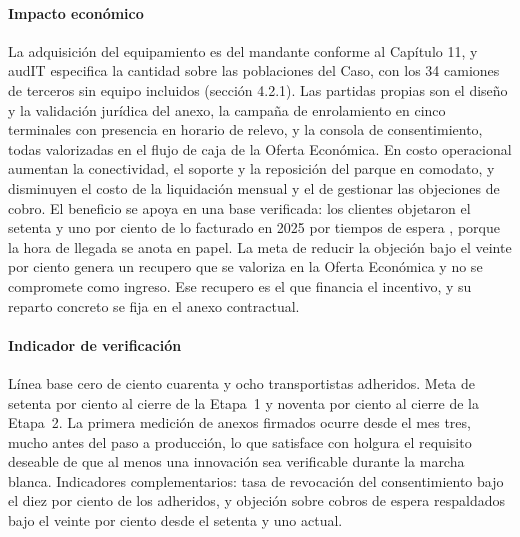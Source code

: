 \paragraph{Impacto económico} La adquisición del equipamiento es del mandante conforme al
Capítulo 11, y audIT especifica la cantidad sobre las poblaciones del Caso, con los 34 camiones de
terceros sin equipo incluidos (sección 4.2.1). Las partidas propias son el diseño y la validación
jurídica del anexo, la campaña de enrolamiento en cinco terminales con presencia en horario de relevo,
y la consola de consentimiento, todas valorizadas en el flujo de caja de la Oferta Económica. En costo
operacional aumentan la conectividad, el soporte y la reposición del parque en comodato, y disminuyen
el costo de la liquidación mensual y el de gestionar las objeciones de cobro. El beneficio se apoya en
una base verificada: los clientes objetaron el setenta y uno por ciento de lo facturado en 2025 por
tiempos de espera , porque la hora de llegada se anota en papel. La meta de
reducir la objeción bajo el veinte por ciento genera un recupero que se valoriza en la Oferta Económica
y no se compromete como ingreso. Ese recupero es el que financia el incentivo, y su reparto concreto se
fija en el anexo contractual.


\paragraph{Indicador de verificación} Línea base cero de ciento cuarenta y ocho transportistas
adheridos. Meta de setenta por ciento al cierre de la Etapa~1 y noventa por ciento al cierre de la
Etapa~2. La primera medición de anexos firmados ocurre desde el mes tres, mucho antes del paso a
producción, lo que satisface con holgura el requisito deseable de que al menos una innovación sea
verificable durante la marcha blanca. Indicadores complementarios: tasa de revocación del
consentimiento bajo el diez por ciento de los adheridos, y objeción sobre cobros de espera respaldados
bajo el veinte por ciento desde el setenta y uno actual.

